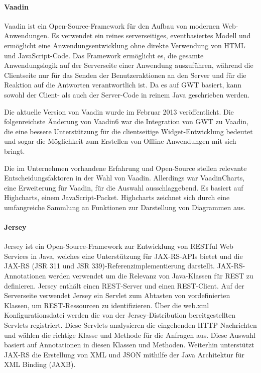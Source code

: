\paragraph{Vaadin}

Vaadin ist ein Open-Source-Framework für den Aufbau von modernen Web-Anwendungen.
Es verwendet ein reines serverseitiges, eventbasiertes Modell und ermöglicht eine Anwendungsentwicklung ohne direkte Verwendung von HTML und JavaScript-Code. Das Framework ermöglicht es, die gesamte Anwendungslogik auf der Serverseite einer Anwendung auszuführen, während die Clientseite nur für das Senden der Benutzeraktionen an den Server und für die Reaktion auf die Antworten verantwortlich ist. Da es auf GWT basiert, kann sowohl der Client- als auch der Server-Code in reinem Java geschrieben werden.

Die aktuelle Version von Vaadin wurde im Februar 2013 veröffentlicht. Die folgenreichste Änderung von Vaadin6 war die Integration von GWT zu Vaadin, die eine bessere Unterstützung für die clientseitige Widget-Entwicklung bedeutet und sogar die Möglichkeit zum Erstellen von Offline-Anwendungen mit sich bringt.

Die im Unternehmen vorhandene Erfahrung und Open-Source stellen relevante Entscheidungsfaktoren in der Wahl von Vaadin. Allerdings war VaadinCharts, eine Erweiterung für Vaadin, für die Auswahl ausschlaggebend. Es basiert auf Highcharts, einem JavaScript-Packet. Highcharts zeichnet sich durch eine umfangreiche Sammlung an Funktionen zur Darstellung von Diagrammen aus. 

\paragraph{Jersey}

Jersey ist ein Open-Source-Framework zur Entwicklung von RESTful Web Services in Java, welches eine Unterstützung für JAX-RS-APIs bietet und die JAX-RS (JSR 311 und JSR 339)-Referenzimplementierung darstellt. JAX-RS-Annotationen werden verwendet um die Relevanz von Java-Klassen für REST zu definieren. Jersey enthält einen REST-Server und einen REST-Client. Auf der Serverseite verwendet Jersey ein Servlet zum Abtasten von vordefinierten Klassen, um REST-Ressourcen zu identifizieren. Über die web.xml Konfigurationsdatei werden die von der Jersey-Distribution bereitgestellten Servlets registriert. Diese Servlets analysieren die eingehenden HTTP-Nachrichten und wählen die richtige Klasse und Methode für die Anfragen aus. Diese Auswahl basiert auf Annotationen in diesen Klassen und Methoden. Weiterhin unterstützt JAX-RS die Erstellung von XML und JSON mithilfe der Java Architektur für XML Binding (JAXB).

